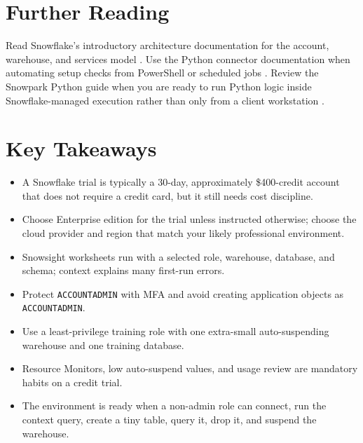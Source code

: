 \section{Further Reading}
Read Snowflake's introductory architecture documentation for the account, warehouse, and services model \cite{snowflakeArchitectureDocs}. Use the Python connector documentation when automating setup checks from PowerShell or scheduled jobs \cite{snowflakeConnectorPythonDocs}. Review the Snowpark Python guide when you are ready to run Python logic inside Snowflake-managed execution rather than only from a client workstation \cite{snowflakeSnowparkPythonDocs}.

\section*{Key Takeaways}
\begin{itemize}
    \item A Snowflake trial is typically a 30-day, approximately \$400-credit account that does not require a credit card, but it still needs cost discipline.
    \item Choose Enterprise edition for the trial unless instructed otherwise; choose the cloud provider and region that match your likely professional environment.
    \item Snowsight worksheets run with a selected role, warehouse, database, and schema; context explains many first-run errors.
    \item Protect \texttt{ACCOUNTADMIN} with MFA and avoid creating application objects as \texttt{ACCOUNTADMIN}.
    \item Use a least-privilege training role with one extra-small auto-suspending warehouse and one training database.
    \item Resource Monitors, low auto-suspend values, and usage review are mandatory habits on a credit trial.
    \item The environment is ready when a non-admin role can connect, run the context query, create a tiny table, query it, drop it, and suspend the warehouse.
\end{itemize}

